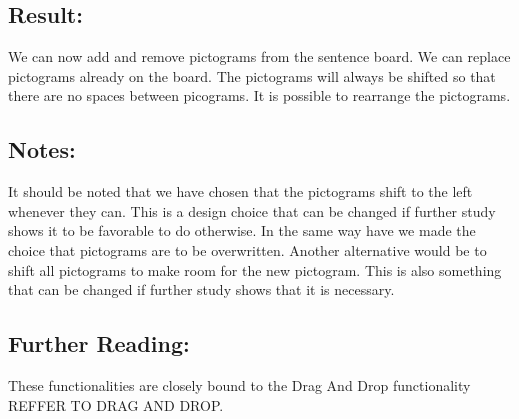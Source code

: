 \subsection*{Result:}
We can now add and remove pictograms from the sentence board. We can replace pictograms already on the board. The pictograms will always be shifted so that there are no spaces between picograms. It is possible to rearrange the pictograms.


\subsection*{Notes:}
It should be noted that we have chosen that the pictograms shift to the left whenever they can. This is a design choice that can be changed if further study shows it to be favorable to do otherwise. 
In the same way have we made the choice that pictograms are to be overwritten. Another alternative would be to shift all pictograms to make room for the new pictogram. This is also something that can be changed if further study shows that it is necessary.


\subsection*{Further Reading:}
These functionalities are closely bound to the Drag And Drop functionality REFFER TO DRAG AND DROP.